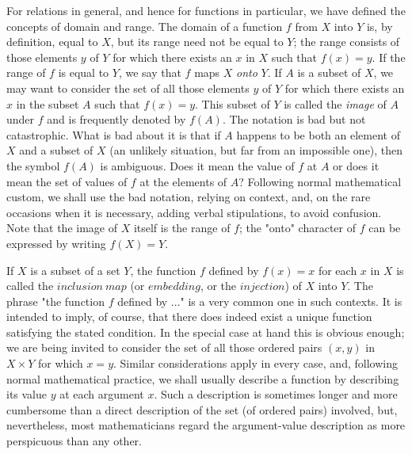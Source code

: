 For relations in general, and hence for functions in particular, we have defined the concepts of domain and range. The domain of a function $f$ from $X$ into $Y$ is, by definition, equal to $X$, but its range need not be equal to $Y$; the range consists of those elements $y$ of $Y$ for which there exists an $x$ in $X$ such that $f(x) = y$. If the range of $f$ is equal to $Y$, we say that $f$ maps $X$ \textit{onto} $Y$. If $A$ is a subset of $X$, we may want to consider the set of all those elements $y$ of $Y$ for which there exists an $x$ in the subset $A$ such that $f(x) = y$. This subset of $Y$ is called the \textit{image} of $A$ under $f$ and is frequently denoted by $f(A)$. The notation is bad but not catastrophic. What is bad about it is that if $A$ happens to be both an element of $X$ and a subset of $X$ (an unlikely situation, but far from an impossible one), then the symbol $f(A)$ is ambiguous. Does it mean the value of $f$ at $A$ or does it mean the set of values of $f$ at the elements of $A$?   Following normal mathematical custom, we shall use the bad notation, relying on context, and, on the rare occasions when it is necessary, adding verbal stipulations, to avoid confusion. Note that the image of $X$ itself is the range of $f$; the "onto" character of $f$ can be expressed by writing $f(X) = Y$. 

If $X$ is a subset of a set $Y$, the function $f$ defined by $f(x) = x$ for each $x$ in $X$ is called the $inclusion\ map$ (or $embedding$, or the $injection$) of $X$ into $Y$. The phrase "the function $f$ defined by ..." is a very common one in such contexts. It is intended to imply, of course, that there does indeed exist a unique function satisfying the stated condition. In the special case at hand this is obvious enough; we are being invited to consider the set of all those ordered pairs $(x, y)$ in $X \times Y$ for which $x = y$. Similar considerations apply in every case, and, following normal mathematical practice, we shall usually describe a function by describing its value $y$ at each argument $x$. Such a description is sometimes longer and more cumbersome than a direct description of the set (of ordered pairs) involved, but, nevertheless, most mathematicians regard the argument-value description as more perspicuous than any other. 

